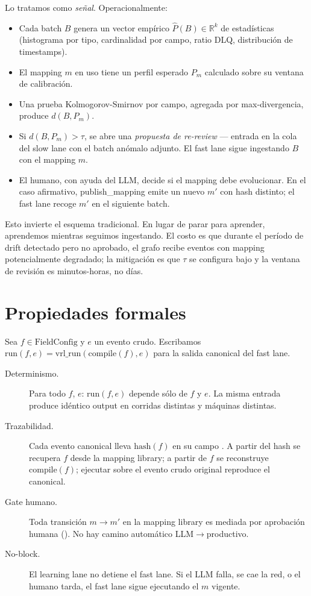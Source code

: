 Lo tratamos como \emph{señal}. Operacionalmente:

\begin{itemize}
    \item Cada batch $B$ genera un vector empírico
    $\hat{P}(B) \in \mathbb{R}^k$ de estadísticas (histograma por
    tipo, cardinalidad por campo, ratio DLQ, distribución de
    timestamps).
    \item El mapping $m$ en uso tiene un perfil esperado $P_m$
    calculado sobre su ventana de calibración.
    \item Una prueba Kolmogorov-Smirnov por campo, agregada por
    max-divergencia, produce $d(B, P_m)$.
    \item Si $d(B, P_m) > \tau$, se abre una \emph{propuesta de
    re-review} — entrada en la cola del slow lane con el batch
    anómalo adjunto. El fast lane sigue ingestando $B$ con el
    mapping $m$.
    \item El humano, con ayuda del LLM, decide si el mapping debe
    evolucionar. En el caso afirmativo, publish\_mapping emite un
    nuevo $m'$ con hash distinto; el fast lane recoge $m'$ en el
    siguiente batch.
\end{itemize}

Esto invierte el esquema tradicional. En lugar de parar para
aprender, aprendemos mientras seguimos ingestando. El costo es que
durante el período de drift detectado pero no aprobado, el grafo
recibe eventos con mapping potencialmente degradado; la mitigación
es que $\tau$ se configura bajo y la ventana de revisión es
minutos-horas, no días.

\section{Propiedades formales}

Sea $f \in \text{FieldConfig}$ y $e$ un evento crudo. Escribamos
$\text{run}(f, e) = \text{vrl\_run}(\text{compile}(f), e)$ para la
salida canonical del fast lane.

\begin{description}
    \item[Determinismo.] Para todo $f$, $e$:
    $\text{run}(f, e)$ depende sólo de $f$ y $e$. La misma entrada
    produce idéntico output en corridas distintas y máquinas
    distintas.
    \item[Trazabilidad.] Cada evento canonical lleva
    $\text{hash}(f)$ en su campo . A
    partir del hash se recupera $f$ desde la mapping library; a
    partir de $f$ se reconstruye $\text{compile}(f)$; ejecutar
    sobre el evento crudo original reproduce el canonical.
    \item[Gate humano.] Toda transición
    $m \to m'$ en la mapping library es mediada por aprobación
    humana (). No hay camino
    automático LLM$\to$productivo.
    \item[No-block.] El learning lane no detiene el fast lane. Si
    el LLM falla, se cae la red, o el humano tarda, el fast lane
    sigue ejecutando el $m$ vigente.
\end{description}

